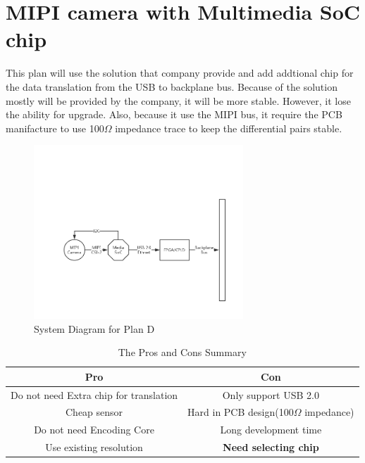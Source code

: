 \documentclass[12pt,article]{memoir}
\begin{document}
\section{MIPI camera with Multimedia SoC chip}
This plan will use the solution that company provide and add addtional chip for the data translation from the USB to backplane bus. Because of the solution mostly will be provided by the company, it will be more stable. However, it lose the ability for upgrade. Also, because it use the MIPI bus, it require the PCB manifacture to use 100$\Omega$ impedance trace to keep the differential pairs stable.
\begin{figure}[htp]
\begin{center}
\includegraphics[width=0.7\textwidth]{img/DR00002_Plan4.png}
 \caption{System Diagram for Plan D}	
\end{center}
\end{figure}
\begin{table}[H]
	\centering
		\begin{tabu}{c | c }
		Pro & Con \\ \hline
		Do not need Extra chip for translation & Only support USB 2.0\\
		Cheap sensor & Hard in PCB design(100$\Omega$ impedance) \\
		Do not need Encoding Core & Long development time \\
		Use existing resolution  & \textbf{Need selecting chip} \\
		\end{tabu}
	\caption{The Pros and Cons Summary}
\end{table}
\newpage
\end{document}

